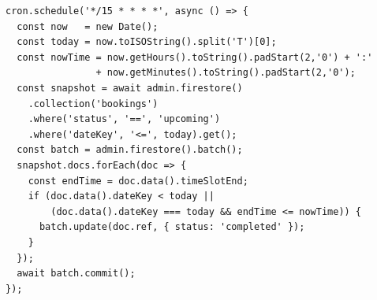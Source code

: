 \begin{lstlisting}[language={}, caption={backend/cron/update\_bookings.js --- node-cron schedule}, label={lst:cron}]
cron.schedule('*/15 * * * *', async () => {
  const now   = new Date();
  const today = now.toISOString().split('T')[0];
  const nowTime = now.getHours().toString().padStart(2,'0') + ':'
                + now.getMinutes().toString().padStart(2,'0');
  const snapshot = await admin.firestore()
    .collection('bookings')
    .where('status', '==', 'upcoming')
    .where('dateKey', '<=', today).get();
  const batch = admin.firestore().batch();
  snapshot.docs.forEach(doc => {
    const endTime = doc.data().timeSlotEnd;
    if (doc.data().dateKey < today ||
        (doc.data().dateKey === today && endTime <= nowTime)) {
      batch.update(doc.ref, { status: 'completed' });
    }
  });
  await batch.commit();
});
\end{lstlisting}
